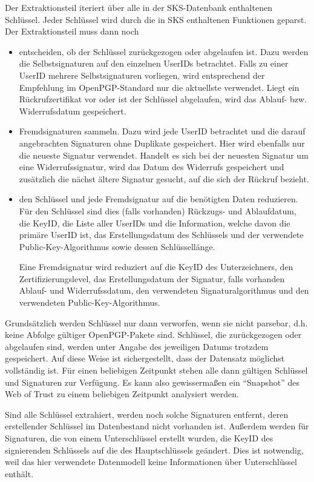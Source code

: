 Der Extraktionsteil iteriert über alle in der SKS-Datenbank
enthaltenen Schlüssel. Jeder Schlüssel wird durch die in SKS
enthaltenen Funktionen geparst. Der Extraktionsteil muss dann noch
\begin{itemize}
\item entscheiden, ob der Schlüssel zurückgezogen oder abgelaufen
  ist. Dazu werden die Selbstsignaturen auf den einzelnen UserIDs
  betrachtet. Falls zu einer UserID mehrere Selbstsignaturen
  vorliegen, wird entsprechend der Empfehlung im OpenPGP-Standard nur
  die aktuellste verwendet. Liegt ein Rückrufzertifikat vor oder ist
  der Schlüssel abgelaufen, wird das Ablauf- bzw. Widerrufsdatum
  gespeichert.
\item Fremdsignaturen sammeln. Dazu wird jede UserID betrachtet und
  die darauf angebrachten Signaturen ohne Duplikate gespeichert. Hier
  wird ebenfalls nur die neueste Signatur verwendet. Handelt es sich
  bei der neuesten Signatur um eine Widerrufssignatur, wird das Datum
  des Widerrufs gespeichert und zusätzlich die nächst ältere Signatur
  gesucht, auf die sich der Rückruf bezieht.
\item den Schlüssel und jede Fremdsignatur auf die benötigten Daten
  reduzieren. Für den Schlüssel sind dies (falls vorhanden) Rückzugs-
  und Ablaufdatum, die KeyID, die Liste aller UserIDs und die
  Information, welche davon die primäre UserID ist, das
  Erstellungsdatum des Schlüssels und der verwendete
  Public-Key-Algorithmus sowie dessen Schlüssellänge.

  Eine Fremdsignatur wird reduziert auf die KeyID des Unterzeichners, 
  den Zertifizierungslevel, das Erstellungsdatum der Signatur,
  falls vorhanden Ablauf- und Widerrufssdatum, den verwendeten
  Signaturalgorithmus und den verwendeten Public-Key-Algorithmus.
\end{itemize}

Grundsätzlich werden Schlüssel nur dann verworfen, wenn sie nicht
parsebar, d.h. keine Abfolge gültiger OpenPGP-Pakete sind. Schlüssel,
die zurückgezogen oder abgelaufen sind, werden unter Angabe des
jeweiligen Datums trotzdem gespeichert. Auf diese Weise ist
sichergestellt, dass der Datensatz möglichst vollständig ist. Für
einen beliebigen Zeitpunkt stehen alle dann gültigen Schlüssel und
Signaturen zur Verfügung. Es kann also gewissermaßen ein
"`Snapshot"' des Web of Trust zu einem beliebigen Zeitpunkt
analysiert werden.

Sind alle Schlüssel extrahiert, werden noch solche Signaturen
entfernt, deren erstellender Schlüssel im Datenbestand nicht vorhanden
ist. Außerdem werden für Signaturen, die von einem Unterschlüssel
erstellt wurden, die KeyID des signierenden Schlüssels auf die des
Hauptschlüssels geändert. Dies ist notwendig, weil das hier
verwendete Datenmodell keine Informationen über Unterschlüssel
enthält.

